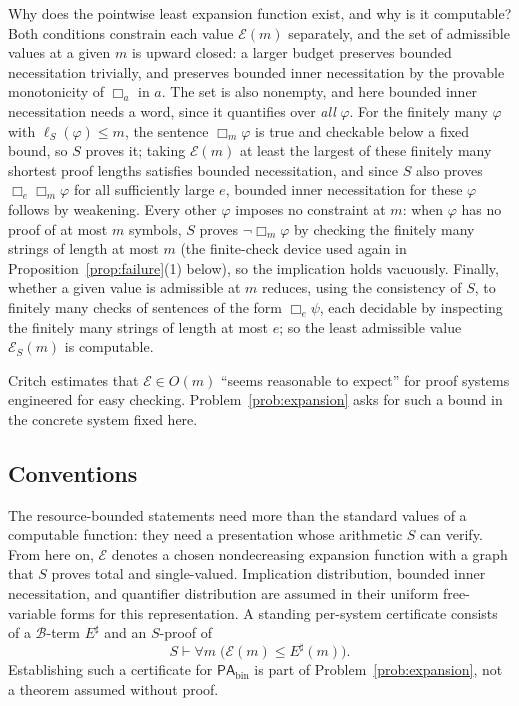 \documentclass[11pt]{amsart}
\theoremstyle{plain}
\theoremstyle{definition}
\newcommand{\PAbin}{\mathsf{PA}_{\mathrm{bin}}}
\newcommand{\Bud}{\mathcal{B}}
\begin{document}
Why does the pointwise least expansion function exist, and why is it computable? Both conditions constrain each value $\mathcal{E}(m)$ separately, and the set of admissible values at a given $m$ is upward closed: a larger budget preserves bounded necessitation trivially, and preserves bounded inner necessitation by the provable monotonicity of $\Box_a$ in $a$. The set is also nonempty, and here bounded inner necessitation needs a word, since it quantifies over \emph{all} $\varphi$. For the finitely many $\varphi$ with $\ell_S(\varphi) \le m$, the sentence $\Box_m\varphi$ is true and checkable below a fixed bound, so $S$ proves it; taking $\mathcal{E}(m)$ at least the largest of these finitely many shortest proof lengths satisfies bounded necessitation, and since $S$ also proves $\Box_e\Box_m\varphi$ for all sufficiently large $e$, bounded inner necessitation for these $\varphi$ follows by weakening. Every other $\varphi$ imposes no constraint at $m$: when $\varphi$ has no proof of at most $m$ symbols, $S$ proves $\neg\Box_m\varphi$ by checking the finitely many strings of length at most $m$ (the finite-check device used again in Proposition~\ref{prop:failure}(1) below), so the implication holds vacuously. Finally, whether a given value is admissible at $m$ reduces, using the consistency of $S$, to finitely many checks of sentences of the form $\Box_e\psi$, each decidable by inspecting the finitely many strings of length at most $e$; so the least admissible value $\mathcal{E}_S(m)$ is computable.

Critch estimates that $\mathcal{E} \in O(m)$ ``seems reasonable to expect'' for proof systems engineered for easy checking. Problem~\ref{prob:expansion} asks for such a bound in the concrete system fixed here.

\subsection{Conventions}
\label{sec:conventions}

The resource-bounded statements need more than the standard values of a computable function: they need a presentation whose arithmetic $S$ can verify. From here on, $\mathcal{E}$ denotes a chosen nondecreasing expansion function with a graph that $S$ proves total and single-valued. Implication distribution, bounded inner necessitation, and quantifier distribution are assumed in their uniform free-variable forms for this representation. A standing per-system certificate consists of a $\Bud$-term $E^\sharp$ and an $S$-proof of
\[
S\vdash \forall m\;\bigl(\mathcal{E}(m)\le E^\sharp(m)\bigr).
\]
Establishing such a certificate for $\PAbin$ is part of Problem~\ref{prob:expansion}, not a theorem assumed without proof.
\end{document}
